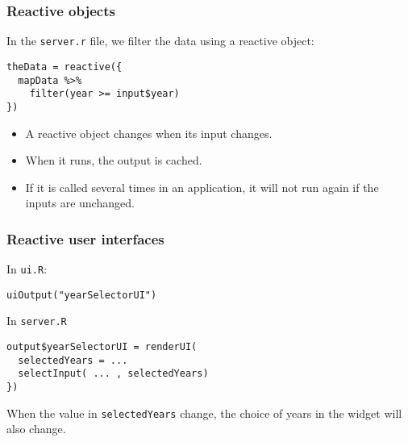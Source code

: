 \documentclass{beamer}
\begin{document}
	\begin{frame}[fragile]
		\frametitle{Reactive objects}

		In the \verb|server.r| file, we filter the data using a reactive object:

		\vspace{1em}
		
		\begin{exampleblock}{}
		\begin{lstlisting}
theData = reactive({
  mapData %>%
    filter(year >= input$year)
})
		\end{lstlisting}
		\end{exampleblock}{}

		\vspace{1em}

		\begin{itemize}
			\item A reactive object changes when its input changes.
			\item When it runs, the output is cached.
			\item If it is called several times in an application, it will not run again if the inputs are unchanged.
		\end{itemize}

	\end{frame}



	\begin{frame}[fragile]
		\frametitle{Reactive user interfaces}
		
		In \verb|ui.R|:
		\begin{exampleblock}{}
		\begin{BVerbatim}
uiOutput("yearSelectorUI")
		\end{BVerbatim}
		\end{exampleblock}{}

		\vspace{1em}

		In \verb|server.R|
		\begin{exampleblock}{}
		\begin{BVerbatim}
output$yearSelectorUI = renderUI(
  selectedYears = ...
  selectInput( ... , selectedYears)
})
		\end{BVerbatim}
		\end{exampleblock}{}

		\vspace{1em}

		When the value in \verb|selectedYears| change, the choice of years in the widget will also change.

	\end{frame}
\end{document}
